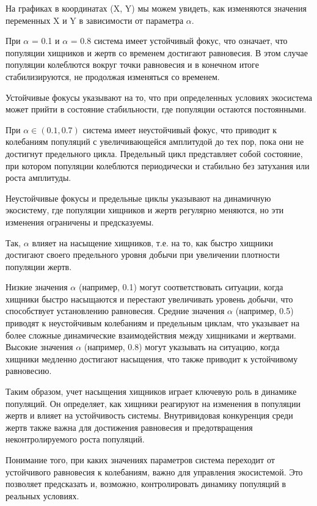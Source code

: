 \documentclass[a4paper,14pt]{extreport}
\begin{document}
    
На графиках в координатах (X, Y) мы можем увидеть, как изменяются значения переменных X и Y в зависимости от параметра $\alpha$.


При $\alpha$ = 0.1 и $\alpha$ = 0.8 система имеет устойчивый фокус, что означает, что популяции хищников и жертв со временем достигают равновесия. В этом случае популяции колеблются вокруг точки равновесия и в конечном итоге стабилизируются, не продолжая изменяться со временем.

Устойчивые фокусы указывают на то, что при определенных условиях экосистема может прийти в состояние стабильности, где популяции остаются постоянными.

При $\alpha \in (0.1, 0.7)$ система имеет неустойчивый фокус, что приводит к колебаниям популяций с увеличивающейся амплитудой до тех пор, пока они не достигнут предельного цикла. Предельный цикл представляет собой состояние, при котором популяции колеблются периодически и стабильно без затухания или роста амплитуды.

Неустойчивые фокусы и предельные циклы указывают на динамичную экосистему, где популяции хищников и жертв регулярно меняются, но эти изменения ограничены и предсказуемы.

Так, $\alpha$ влияет на насыщение хищников, т.е. на то, как быстро хищники достигают своего предельного уровня добычи при увеличении плотности популяции жертв.

Низкие значения $\alpha$ (например, 0.1) могут соответствовать ситуации, когда хищники быстро насыщаются и перестают увеличивать уровень добычи, что способствует установлению равновесия.
Средние значения $\alpha$ (например, 0.5) приводят к неустойчивым колебаниям и предельным циклам, что указывает на более сложные динамические взаимодействия между хищниками и жертвами.
Высокие значения $\alpha$ (например, 0.8) могут указывать на ситуацию, когда хищники медленно достигают насыщения, что также приводит к устойчивому равновесию.

Таким образом, учет насыщения хищников играет ключевую роль в динамике популяций. Он определяет, как хищники реагируют на изменения в популяции жертв и влияет на устойчивость системы. Внутривидовая конкуренция среди жертв также важна для достижения равновесия и предотвращения неконтролируемого роста популяций. 

Понимание того, при каких значениях параметров система переходит от устойчивого равновесия к колебаниям, важно для управления экосистемой. Это позволяет предсказать и, возможно, контролировать динамику популяций в реальных условиях.
\end{document}
